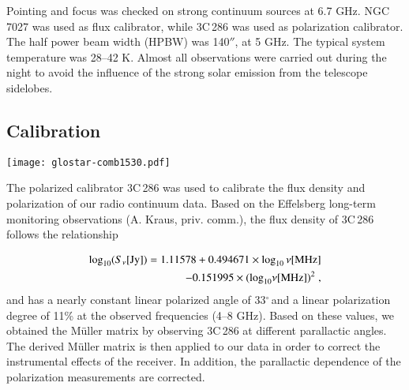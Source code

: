 \documentclass{aa}
\newcommand{\degree}{$^\circ$}
\begin{document}
Pointing and focus was checked on strong continuum sources at 6.7 GHz. NGC\,7027 was used as flux calibrator, while 3C\,286 was used as polarization calibrator. The half power beam width (HPBW) was 140$''$, at 5 GHz. The typical system temperature was 28--42 K. Almost all observations were carried out during the night to avoid the influence of the strong solar emission from the telescope sidelobes. 

\subsection{Calibration}

\begin{figure*}
\texttt{[image: glostar-comb1530.pdf]}
\caption{Zero-level shift correction for the Effelsberg data. (a) Effelsberg 4.8 GHz continuum image. (b) Urumqi 6 cm continuum emission overlaid with the Effelsberg 4.8 GHz continuum contours. Both data sets have been convolved to an angular resolution of 15\arcmin. The contours start at 50 mK, and each contour is twice the previous one. (c) Difference map derived by subtracting the Urumqi 6 cm continuum emission from the Effelsberg 4.8 GHz continuum map in Fig.~\ref{fig:bgf}b. (d) Extended emission component of Fig.~\ref{fig:bgf}c derived by the background filter method. (e) Compact emission component derived by the background filter method (f) Restored Effelsberg 4.8 GHz continuum image.}
\label{fig:bgf}
\end{figure*}


The polarized calibrator 3C\,286 was used to calibrate the flux density and polarization of our radio continuum data. Based on the Effelsberg long-term monitoring
observations (A. Kraus, priv. comm.), the flux density of 3C\,286 follows the relationship

\begin{equation}
\begin{split}
 {\rm log}_{10}(S_{\nu} [{\rm Jy}]) = 1.11578+ 0.494671\times\log_{10}\nu [{\rm MHz}]\\
-0.151995\times ({\rm log}_{10}\nu [{\rm MHz}])^{2} \;,
\end{split}
\end{equation}
and has a nearly constant linear polarized angle of 33\degree\,and a linear polarization degree of 11\% at the observed frequencies (4--8 GHz). Based on these values, we obtained the M{\"u}ller matrix by observing 3C\,286 at different parallactic angles. The derived M{\"u}ller matrix is then applied to our data in order to correct the instrumental effects of the receiver. In addition, the parallactic dependence of the polarization measurements are corrected.
\end{document}

